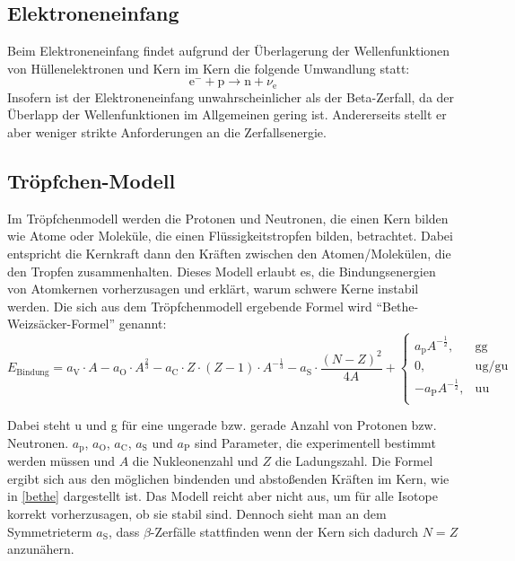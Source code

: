 \documentclass[
	a4paper,
	12pt,
	pagesize,
	ngerman
]{scrartcl}
\begin{document}
		\subsection{Elektroneneinfang}
		Beim Elektroneneinfang findet aufgrund der Überlagerung der Wellenfunktionen von Hüllenelektronen und Kern im Kern die folgende Umwandlung statt:
		\begin{equation}
			\label{eq_elec_cap}
			\text{e}^- + \text{p} \rightarrow \text{n} + \nu_{\text{e}}
		\end{equation}
		Insofern ist der Elektroneneinfang unwahrscheinlicher als der Beta-Zerfall, da der Überlapp der Wellenfunktionen im Allgemeinen gering ist.
		Andererseits stellt er aber weniger strikte Anforderungen an die Zerfallsenergie.

		\subsection{Tröpfchen-Modell} %

		Im Tröpfchenmodell werden die Protonen und Neutronen, die einen Kern bilden wie Atome oder Moleküle, die einen Flüssigkeitstropfen bilden, betrachtet.
		Dabei entspricht die Kernkraft dann den Kräften zwischen den Atomen/Molekülen, die den Tropfen zusammenhalten.
		Dieses Modell erlaubt es, die Bindungsenergien von Atomkernen vorherzusagen und erklärt, warum schwere Kerne instabil werden.
		Die sich aus dem Tröpfchenmodell ergebende Formel wird \enquote{Bethe-Weizsäcker-Formel} genannt:
		\begin{equation}
			E_\text{Bindung} = a_\text{V} \cdot A - a_\text{O} \cdot A^{\frac{2}{3}}
			-a_\text{C} \cdot Z \cdot (Z-1) \cdot A^{- \frac{1}{3}} - a_\text{S} \cdot \frac{(N-Z)^2}{4A} +
			\begin{cases}
				a_\text{p} A^{- \frac{1}{2}}, &\text{gg}\\
				0, &\text{ug/gu}\\
				-a_\text{P} A^{- \frac{1}{2}}, &\text{uu}\\
			\end{cases}
		\end{equation}

		Dabei steht u und g für eine ungerade bzw. gerade Anzahl von Protonen bzw. Neutronen.
		$a_\text{p}$, $a_\text{O}$, $a_\text{C}$, $a_\text{S}$ und $a_\text{P}$ sind Parameter, die experimentell bestimmt werden müssen und $A$ die Nukleonenzahl und $Z$ die Ladungszahl.
		Die Formel ergibt sich aus den möglichen bindenden und abstoßenden Kräften im Kern, wie in \cref{bethe} dargestellt ist.
		Das Modell reicht aber nicht aus, um für alle Isotope korrekt vorherzusagen, ob sie stabil sind. %
		Dennoch sieht man an dem Symmetrieterm $a_\text{S}$, dass $\beta$-Zerfälle stattfinden wenn der Kern sich dadurch $N=Z$ anzunähern. %
\end{document}
